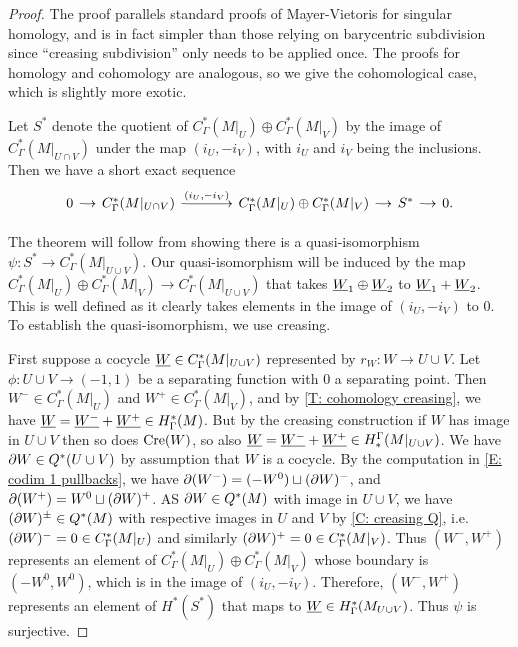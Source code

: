 \begin{proof}
The proof parallels standard proofs of Mayer-Vietoris for singular homology, and is in fact simpler than those relying on barycentric subdivision since ``creasing subdivision'' only needs to be applied once. The proofs for homology and cohomology are analogous, so we give the cohomological case, which is slightly more exotic.


Let $S^*$ denote the quotient of $C_{\Gamma}^*(M|_U)\oplus C_{\Gamma}^{*}(M|_V)$ by the image of $C_{\Gamma}^*(M|_{U \cap V})$ under the map $(i_U, -i_V)$, with $i_U$ and $i_V$ being the inclusions.
Then we have a short exact sequence
\begin{equation}\label{E: homology MV SES}
\begin{tikzcd}[
column sep=small,
arrow style=math font,
cells={nodes={text height=2ex,text depth=0.75ex}}
]
0 \arrow[r] &
C_{\Gamma}^{*}(M|_{U \cap V}) \arrow[r, "(i_U{,}-i_V)"] &[25pt]
C_{\Gamma}^*(M|_U) \oplus C_{\Gamma}^{*}(M|_V) \arrow[r] &
S^* \arrow[r] &
0.
\end{tikzcd}
\end{equation}

The theorem will follow from showing there is a quasi-isomorphism  $\psi:S^* \to C_{\Gamma}^*(M|_{U \cup V})$.
Our quasi-isomorphism will be induced by the map $C_{\Gamma}^*(M|_U)\oplus C_{\Gamma}^{*}(M|_V)\to C_{\Gamma}^*(M|_{U \cup V})$ that takes $\underline{W}_1\oplus \underline{W}_2$ to $\underline{W}_1+\underline{W}_2$. This is well defined as it clearly takes elements in the image of $(i_U{,}-i_V)$ to $0$. To establish the quasi-isomorphism, we use creasing.

First suppose a cocycle $\underline{W}\in C_{\Gamma}^*(M|_{U \cup V})$ represented by $r_W \colon W \to U\cup V$. Let $\phi:U\cup V\to (-1,1)$ be a separating function with $0$ a separating point. Then $W^-\in  C_{\Gamma}^*(M|_{U})$ and  $W^+\in  C_{\Gamma}^*(M|_{V})$, and by \cref{T: cohomology creasing}, we have $\underline{W}=\underline{W^-}+\underline{W^+}\in H^*_\Gamma(M)$. But by the creasing construction if $W$ has image in $U\cup V$ then so does $\mathrm{Cre}(W)$, so also $\underline{W}=\underline{W^-}+\underline{W^+}\in H_*^\Gamma(M|_{U\cup V})$. We have $\partial W\in Q^*(U\cup V)$ by assumption that $W$ is a cocycle. By the computation in \cref{E: codim 1 pullbacks}, we have $\partial( W^-)=(-W^0)\sqcup (\partial W)^-$, and  $\partial (W^+)=W^0\sqcup (\partial W)^+$. AS $\partial W\in Q^*(M)$ with image in $U\cup V$, we have $(\partial W)^\pm\in Q^*(M)$ with respective images in $U$ and $V$ by \cref{C: creasing Q}, i.e.\ $(\partial W)^-=0\in C^*_\Gamma(M|_U)$ and similarly $(\partial W)^+=0\in C^*_\Gamma(M|_V)$.
Thus $(W^-, W^+)$ represents an element of $C_{\Gamma}^*(M|_U)\oplus C_{\Gamma}^{*}(M|_V)$ whose boundary is $(-W^0,W^0)$, which is in the image of $(i_U,-i_V)$. Therefore,  $(W^-, W^+)$ represents an element of
$H^*(S^*)$ that maps to $\underline{W}\in H^*_\Gamma(M_{U\cup V})$. Thus $\psi$ is surjective.



\end{proof}
